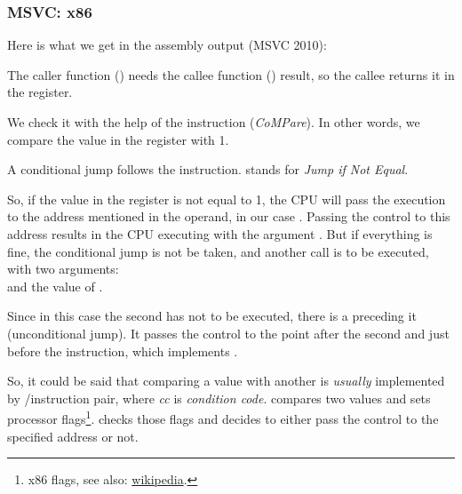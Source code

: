 \subsubsection{MSVC: x86}

Here is what we get in the assembly output (MSVC 2010):



The \gls{caller} function (\main) needs the \gls{callee} function (\scanf) result, 
so the \gls{callee} returns it in the \EAX register.

We check it with the help of the instruction  (\emph{CoMPare}). In other words, we compare the value in the \EAX register with 1.

A \JNE conditional jump follows the \CMP instruction. \JNE stands for \emph{Jump if Not Equal}.

So, if the value in the \EAX register is not equal to 1, the \ac{CPU} will pass the execution to the address mentioned in the \JNE operand, in our case .
Passing the control to this address results in the \ac{CPU} executing \printf with the argument .
But if everything is fine, the conditional jump is not be taken, and another \printf call is to be executed, with two arguments:\\
 and the value of .

Since in this case the second \printf has not to be executed, there is a \JMP preceding it (unconditional jump). 
It passes the control to the point after the second \printf and just before the  instruction, which implements .

So, it could be said that comparing a value with another is \emph{usually} implemented by \CMP/\Jcc instruction pair, where \emph{cc} is \emph{condition code}.
\CMP compares two values and sets processor flags\footnote{x86 flags, see also: \href{http://go.yurichev.com/17120}{wikipedia}.}.
\Jcc checks those flags and decides to either pass the control to the specified address or not.

